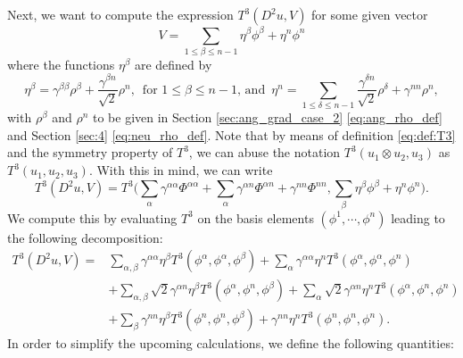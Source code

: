 \documentclass[12pt]{article}
\numberwithin{equation}{section}
\theoremstyle{plain}
\theoremstyle{definition}
\theoremstyle{remark}
\begin{document}
Next, we want to compute the expression $T^3(D^2 u, V )$ for some given vector 
$$V =\sum_{1\leq\beta\leq n-1} \eta^{\beta} \phi^{\beta} + \eta^n \phi^n$$
where the functions $\eta^{\beta}$ are defined by
\begin{equation*}
    \eta^{\beta} = \gamma^{\beta \beta} \rho^{\beta} + \frac{ \gamma^{\beta n} }{\sqrt{2}} \rho^n,\,\,\,\text{for $1\leq \beta\leq n-1$, and}\,\,\,
    \eta^n = \sum_{1\leq \delta\leq n-1} \frac{\gamma^{\delta n}}{\sqrt2} \rho^{\delta}  + \gamma^{n n} \rho^n ,  
\end{equation*}
with $\rho^{\beta}$ and $\rho^n$ to be given in 
Section \ref{sec:ang_grad_case_2} \eqref{eq:ang_rho_def} and Section \ref{sec:4} \eqref{eq:neu_rho_def}.
Note that by means of definition \eqref{eq:def:T3} and the symmetry property of
$T^3$, we can abuse the notation $T^3(u_1\otimes u_2, u_3)$ as
$T^3(u_1, u_2, u_3)$.
With this in mind, we can write
\begin{equation}
    T^3(D^2 u, V ) = T^3\Big( \sum_{\alpha} \gamma^{\alpha \alpha} \Phi^{\alpha \alpha} + \sum_{\alpha} \gamma^{\alpha n} \Phi^{\alpha n} + \gamma^{n n} \Phi^{n n} , \sum_{\beta} \eta^{\beta} \phi^{\beta} + \eta^n \phi^n \Big).
\end{equation}
We compute this by evaluating $T^3$ on the basis elements $(\phi^1, \cdots, \phi^n)$ leading to the following decomposition:
\begin{equation} \label{eq:T3_cal1}
\begin{split}
    T^3(D^2 u, V ) = & \sum_{\alpha,\beta} \gamma^{\alpha \alpha} \eta^{\beta} T^3 (\phi^{\alpha}, \phi^{\alpha}, \phi^{\beta}) + \sum_{\alpha} \gamma^{\alpha \alpha} \eta^{n} T^3 (\phi^{\alpha}, \phi^{\alpha}, \phi^{n}) \\
    & + \sum_{\alpha,\beta} \sqrt{2} \gamma^{\alpha n} \eta^{\beta} T^3 (\phi^{\alpha}, \phi^{n}, \phi^{\beta}) + \sum_{\alpha} \sqrt{2} \gamma^{\alpha n} \eta^{n} T^3 (\phi^{\alpha}, \phi^{n}, \phi^{n}) \\
    & + \sum_{\beta} \gamma^{n n} \eta^{\beta} T^3 (\phi^{n}, \phi^{n}, \phi^{\beta}) + \gamma^{n n} \eta^{n} T^3 (\phi^{n}, \phi^{n}, \phi^{n}).   
\end{split}
\end{equation}
In order to simplify the upcoming calculations, we define the following quantities:
\end{document}
